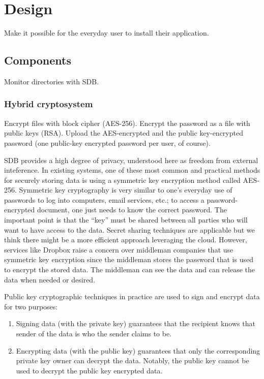 \section{Design}

Make it possible for the everyday user to install their application.

\subsection{Components}

Monitor directories with SDB.

\subsubsection*{Hybrid cryptosystem}
Encrypt files with block cipher (AES-256). Encrypt the password as a
file with public keys (RSA).  Upload the AES-encrypted and the public
key-encrypted password (one public-key encrypted password per user, of
course).

SDB provides a high degree of privacy, understood here as freedom from
external inteference. In existing systems, one of these most common
and practical methods for securely storing data is using a symmetric
key encryption method called AES-256. Symmetric key cryptography is
very similar to one's everyday use of passwords to log into computers,
email services, etc.; to access a password-encrypted document, one
just needs to know the correct password. The important point is that
the ``key'' must be shared between all parties who will want to have
access to the data. Secret sharing techniques are applicable but we
think there might be a more efficient approach leveraging the
cloud. However, services like Dropbox raise a concern over middleman
companies that use symmetric key encryption since the middleman stores
the password that is used to encrypt the stored data. The middleman
can see the data and can release the data when needed or desired.

Public key cryptographic techniques in practice are used to sign and
encrypt data for two purposes: 
\begin{enumerate}
\item Signing data (with the private key) guarantees that the
  recipient knows that sender of the data is who the sender claims to
  be.
\item Encrypting data (with the public key) guarantees that only the
  corresponding private key owner can decrypt the data. Notably, the
  public key cannot be used to decrypt the public key encrypted data.
\end{enumerate}

